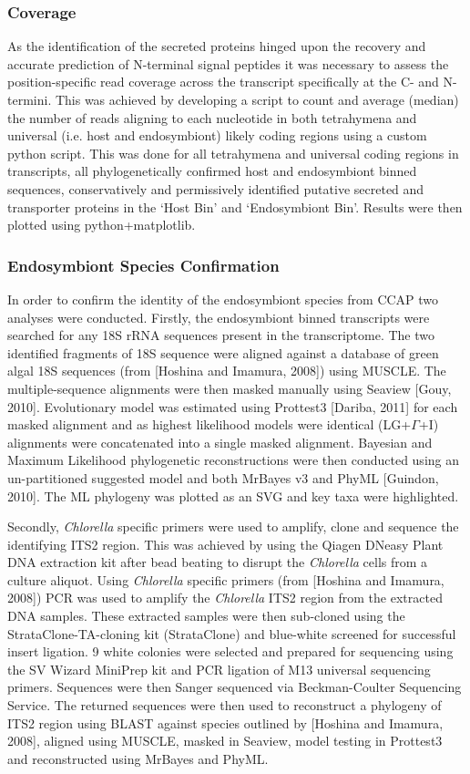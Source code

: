 \documentclass[a4paper,11pt]{article}
\begin{document}
\subsubsection{Coverage}
As the identification of the secreted proteins hinged upon the recovery and accurate prediction of N-terminal signal peptides it was necessary to assess the position-specific read coverage across the transcript specifically at the C- and N- termini. 
This was achieved by developing a script to count and average (median) the number of reads aligning to each nucleotide in both tetrahymena and universal (i.e. host and endosymbiont) likely coding regions using a custom python script.  
This was done for all tetrahymena and universal coding regions in transcripts, all phylogenetically confirmed host and endosymbiont binned sequences, conservatively and permissively identified putative secreted and transporter proteins in the `Host Bin' and `Endosymbiont Bin'. 
Results were then plotted using python+matplotlib.

\subsubsection{Endosymbiont Species Confirmation}
In order to confirm the identity of the endosymbiont species from CCAP two analyses were conducted. 
Firstly, the endosymbiont binned transcripts were searched for any 18S rRNA sequences present in the transcriptome.  
The two identified fragments of 18S sequence were aligned against a database of green algal 18S sequences (from [Hoshina and Imamura, 2008]) using MUSCLE.    
The multiple-sequence alignments were then masked manually using Seaview [Gouy, 2010].  
Evolutionary model was estimated using Prottest3 [Dariba, 2011] for each masked alignment and as highest likelihood models were identical (LG+$\Gamma$+I) alignments were concatenated into a single masked alignment.  
Bayesian and Maximum Likelihood phylogenetic reconstructions were then conducted using an un-partitioned suggested model and both MrBayes v3 and PhyML [Guindon, 2010].  
The ML phylogeny was plotted as an SVG and key taxa were highlighted.

Secondly, \textit{Chlorella} specific primers were used to amplify, clone and sequence the identifying ITS2 region.  
This was achieved by using the Qiagen DNeasy Plant DNA extraction kit after bead beating to disrupt the \textit{Chlorella} cells from a culture aliquot. 
Using \textit{Chlorella} specific primers (from [Hoshina and Imamura, 2008]) PCR was used to amplify the \textit{Chlorella} ITS2 region from the  extracted DNA samples.  
These extracted samples were then sub-cloned using the StrataClone-TA-cloning kit (StrataClone) and blue-white screened for successful insert ligation. 
9 white colonies were selected and prepared for sequencing using the SV Wizard MiniPrep kit and PCR ligation of M13 universal sequencing primers.  
Sequences were then Sanger sequenced via Beckman-Coulter Sequencing Service.  
The returned sequences were then used to reconstruct a phylogeny of ITS2 region using BLAST against species outlined by [Hoshina and Imamura, 2008], aligned using MUSCLE, masked in Seaview, model testing in Prottest3 and reconstructed using MrBayes and PhyML.
\end{document}
